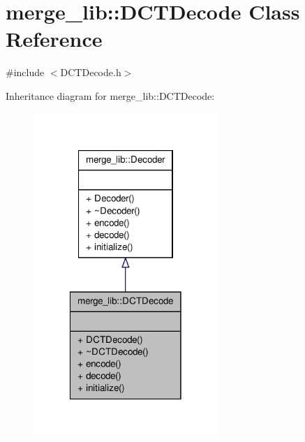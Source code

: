 \hypertarget{classmerge__lib_1_1_d_c_t_decode}{\section{merge\-\_\-lib\-:\-:D\-C\-T\-Decode Class Reference}
\label{d4/da1/classmerge__lib_1_1_d_c_t_decode}
}


{\ttfamily \#include $<$D\-C\-T\-Decode.\-h$>$}



Inheritance diagram for merge\-\_\-lib\-:\-:D\-C\-T\-Decode\-:
\nopagebreak
\begin{figure}[H]
\begin{center}
\leavevmode
\includegraphics[width=198pt]{d6/df3/classmerge__lib_1_1_d_c_t_decode__inherit__graph}
\end{center}
\end{figure}


